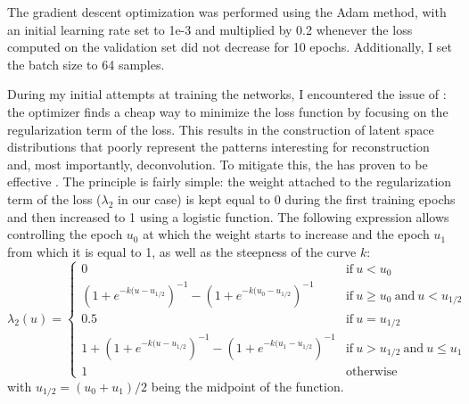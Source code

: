 \documentclass{article}
\begin{document}
The gradient descent optimization was performed using the Adam method, with an initial learning rate set to 1e-3 and multiplied by 0.2 whenever the loss computed on the validation set did not decrease for 10 epochs.
Additionally, I set the batch size to 64 samples.

During my initial attempts at training the networks, I encountered the issue of : the optimizer finds a cheap way to minimize the loss function by focusing on the regularization term of the loss.
This results in the construction of latent space distributions that poorly represent the patterns interesting for reconstruction and, most importantly, deconvolution.
To mitigate this, the  has proven to be effective \cite{bowman_2015_generating, fu2_019_cyclical}.
The principle is fairly simple: the weight attached to the regularization term of the loss ($\lambda_2$ in our case) is kept equal to 0 during the first training epochs and then increased to 1 using a logistic function.
The following expression allows controlling the epoch $u_0$ at which the weight starts to increase and the epoch $u_1$ from which it is equal to 1, as well as the steepness of the curve $k$:
$$
\lambda_2(u) =
\begin{cases}
    0 & \text{if} ~u < u_0 \\
    (1 + e^{-k(u - u_{1/2}})^{-1} - (1 + e^{-k(u_0 - u_{1/2}})^{-1} & \text{if} ~u \geq u_0 ~\text{and} ~u < u_{1/2} \\
    0.5 & \text{if} ~u = u_{1/2} \\
    1 + (1 + e^{-k(u - u_{1/2}})^{-1} - (1 + e^{-k(u_1 - u_{1/2}})^{-1} & \text{if} ~u > u_{1/2} ~\text{and} ~u \leq u_1 \\
    1 & \text{otherwise}
\end{cases}
$$
with $u_{1/2} = (u_0 + u_1) / 2$ being the midpoint of the function.
\end{document}
